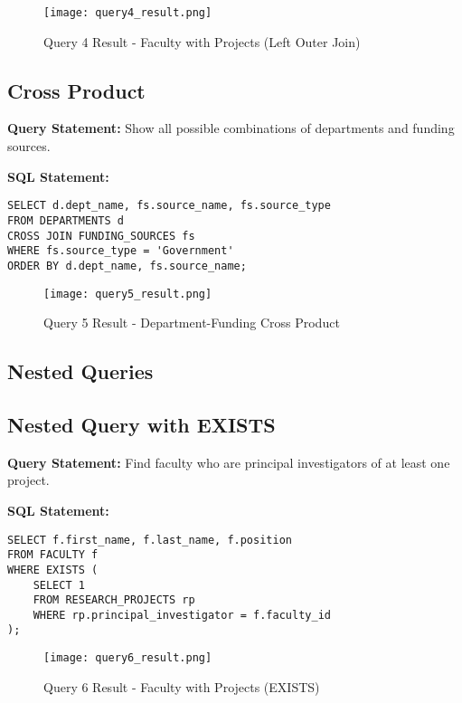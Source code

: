 \documentclass[12pt,a4paper]{article}
\begin{document}
\begin{figure}[H]
    \centering
    \texttt{[image: query4\_result.png]}
    \caption{Query 4 Result - Faculty with Projects (Left Outer Join)}
\end{figure}

\subsection{Cross Product}
\textbf{Query Statement:} Show all possible combinations of departments and funding sources.

\textbf{SQL Statement:}
\begin{lstlisting}[style=sqlstyle]
SELECT d.dept_name, fs.source_name, fs.source_type
FROM DEPARTMENTS d
CROSS JOIN FUNDING_SOURCES fs
WHERE fs.source_type = 'Government'
ORDER BY d.dept_name, fs.source_name;
\end{lstlisting}

\begin{figure}[H]
    \centering
    \texttt{[image: query5\_result.png]}
    \caption{Query 5 Result - Department-Funding Cross Product}
\end{figure}

\subsection{Nested Queries}

\subsection{Nested Query with EXISTS}
\textbf{Query Statement:} Find faculty who are principal investigators of at least one project.

\textbf{SQL Statement:}
\begin{lstlisting}[style=sqlstyle]
SELECT f.first_name, f.last_name, f.position
FROM FACULTY f
WHERE EXISTS (
    SELECT 1
    FROM RESEARCH_PROJECTS rp
    WHERE rp.principal_investigator = f.faculty_id
);
\end{lstlisting}

\begin{figure}[H]
    \centering
    \texttt{[image: query6\_result.png]}
    \caption{Query 6 Result - Faculty with Projects (EXISTS)}
\end{figure}
\end{document}
